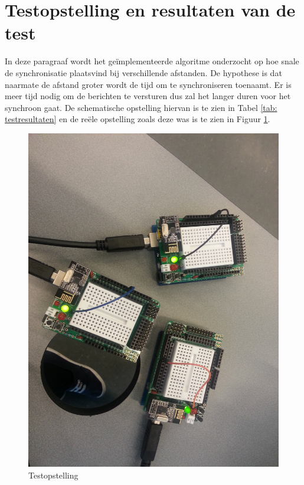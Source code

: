 \documentclass{article}
\begin{document}
\section{Testopstelling en resultaten van de test}
In deze paragraaf wordt het ge\"{i}mplementeerde algoritme onderzocht op hoe snale de synchronisatie plaatsvind bij verschillende afstanden. De hypothese is dat naarmate de afstand groter wordt de tijd om te synchroniseren toenaamt. Er is meer tijd nodig om de berichten te versturen dus zal het langer duren voor het synchroon gaat. De schematische opstelling hiervan is te zien in Tabel \ref{tab: testresultaten} en de re\"{e}le opstelling zoals deze was is te zien in Figuur \ref{fig: Nodes_tijdens_testen}. 
\begin{figure}[h]
\centering\includegraphics[scale=0.09, angle=90]{Nodes_tijdens_testen}
\caption{Testopstelling}
\label{fig: Nodes_tijdens_testen}
\end{figure}
\end{document}
